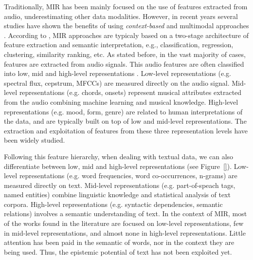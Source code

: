 Traditionally, MIR has been mainly focused on the use of features extracted from audio, underestimating other data modalities. However, in recent years several studies have shown the benefits of using \textit{context-based} and multimodal approaches \cite{Schedl2014}. 
According to \cite{humphrey2012}, MIR approaches are typicaly based on a two-stage architecture of feature extraction and semantic interpretation, e.g., classification, regression, clustering, similarity ranking, etc. As stated before, in the vast majority of cases, features are extracted from audio signals. This audio features are often classified into low, mid and high-level representations \cite{bello2015}. Low-level representations (e.g. spectral flux, cepstrum, MFCCs) are measured directly on the audio signal. Mid-level representations (e.g. chords, onsets) represent musical attributes extracted from the audio combining machine learning and musical knowledge. High-level representations (e.g. mood, form, genre) are related to human interpretations of the data, and are typically built on top of low and mid-level representations. The extraction and exploitation of features from these three representation levels have been widely studied. 

Following this feature hierarchy, when dealing with textual data, we can also differentiate between low, mid and high-level representations (see Figure~\ref{}). Low-level representations (e.g. word frequencies, word co-occurrences, n-grams) are measured directly on text. Mid-level representations (e.g. part-of-speach tags, named entities) combine linguistic knowledge and statistical analysis of text corpora. High-level representations (e.g. syntactic dependencies, semantic relations) involves a semantic understanding of text. In the context of MIR, most of the works found in the literature are focused on low-level representations, few in mid-level representations, and almost none in high-level representations. Little attention has been paid in the semantic of words, nor in the context they are being used. Thus, the epistemic potential of text has not been exploited yet.


